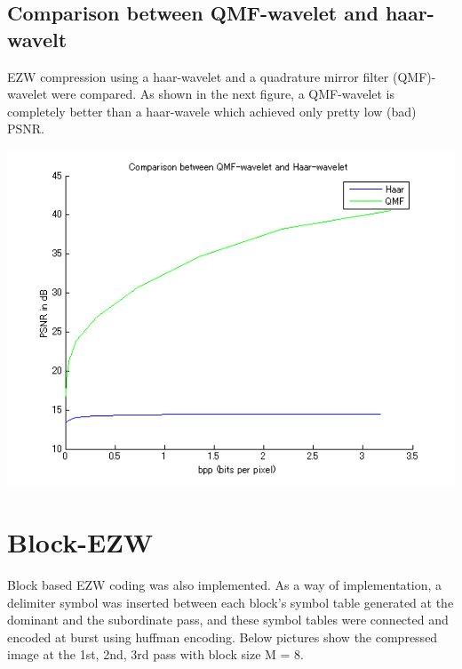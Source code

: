 \documentclass[article,oneside]{memoir}
\begin{document}
\newpage

\subsection{Comparison between QMF-wavelet and haar-wavelt}

EZW compression using a haar-wavelet and a quadrature mirror filter (QMF)-wavelet were compared. 
As shown in the next figure, a QMF-wavelet is completely better than a haar-wavele which achieved only pretty low (bad) PSNR. 

\begin{center}
\includegraphics[width=14cm]{../src/LenaEZWPlotQMFvsHaar.png}\\
\end{center}


\section{Block-EZW}

Block based EZW coding was also implemented. As a way of implementation, a delimiter symbol was inserted between each block's symbol table generated at the dominant and the subordinate pass, and these symbol tables were connected and encoded at burst using huffman encoding. 
Below pictures show the compressed image at the 1st, 2nd, 3rd pass with block size M = 8. 
\end{document}
